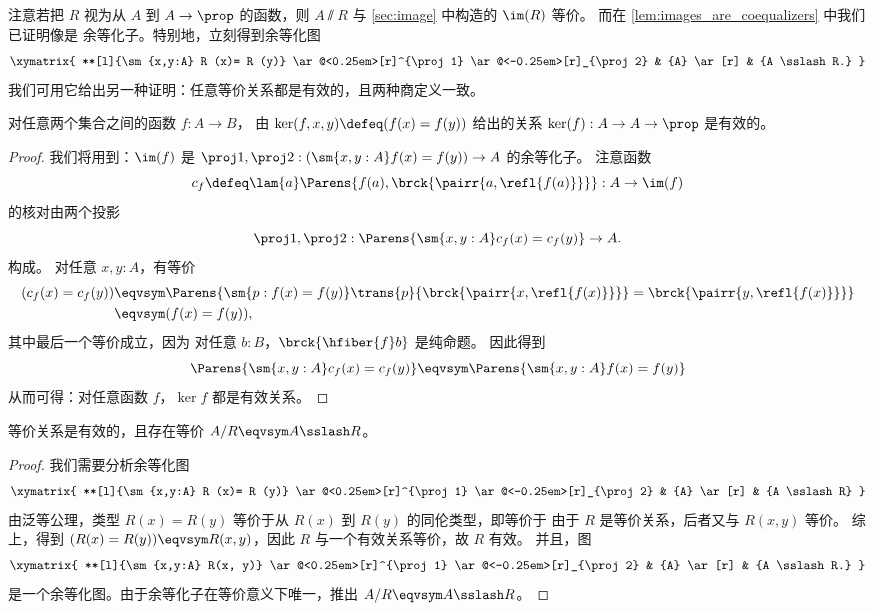 注意若把 $R$ 视为从 $A$ 到 $A\to \prop$ 的函数，则 $A\sslash R$ 与 \cref{sec:image} 中构造的 $\im(R)$ 等价。
而在 \cref{lem:images_are_coequalizers} 中我们已证明像是
余等化子。特别地，立刻得到余等化图
\begin{equation*}
  \xymatrix{
    **[l]{\sm{x,y:A} R (x)= R (y)}
    \ar@<0.25em>[r]^{\proj1}
    \ar@<-0.25em>[r]_{\proj2}
    &
    {A}
    \ar[r]
    &
    {A \sslash R.}
  }
\end{equation*}
我们可用它给出另一种证明：任意等价关系都是有效的，且两种商定义一致。

\begin{thm}\label{prop:kernels_are_effective}
对任意两个集合之间的函数 $f:A\to B$，
由
$\ker(f,x,y)\defeq (f(x)= f(y))$
给出的关系 $\ker(f):A\to A\to\prop$ 是有效的。
\end{thm}

\begin{proof}
我们将用到：$\im(f)$ 是
$\proj1,\proj2:(\sm{x,y:A} f(x)= f(y))\to A$ 的余等化子。
注意函数
\[c_f\defeq\lam{a} \Parens{f(a),\brck{\pairr{a,\refl{f(a)}}}}
: A \to \im(f)
\]
的核对由两个投影
\begin{equation*}
\proj1,\proj2:\Parens{\sm{x,y:A} c_f(x)= c_f(y)}\to A.
\end{equation*}
构成。
对任意 $x,y:A$，有等价
\begin{align*}
  (c_f(x)= c_f(y))
  & \eqvsym \Parens{\sm{p:f(x)= f(y)} \trans{p}{\brck{\pairr{x,\refl{f(x)}}}} =\brck{\pairr{y,\refl{f(x)}}}}\\
  & \eqvsym (f(x)= f(y)),
\end{align*}
其中最后一个等价成立，因为
对任意 $b:B$，$\brck{\hfiber{f}b}$ 是纯命题。
因此得到
\begin{equation*}
\Parens{\sm{x,y:A} c_f(x)= c_f(y)}\eqvsym \Parens{\sm{x,y:A} f(x)= f(y)}
\end{equation*}
从而可得：对任意函数 $f$，$\ker f$ 都是有效关系。
\end{proof}

\begin{thm}
等价关系是有效的，且存在等价 $A/R \eqvsym A\sslash  R $。
\end{thm}

\begin{proof}
我们需要分析余等化图
\begin{equation*}
  \xymatrix{
    **[l]{\sm{x,y:A} R (x)= R (y)}
    \ar@<0.25em>[r]^{\proj1}
    \ar@<-0.25em>[r]_{\proj2}
    &
    {A}
    \ar[r]
    &
    {A \sslash R}
  }
\end{equation*}
由泛等公理，类型 $R(x) = R(y)$ 等价于从 $R(x)$ 到 $R(y)$ 的同伦类型，即等价于
由于 $R$ 是等价关系，后者又与 $R(x,y)$ 等价。
综上，得到 $(R(x) = R(y)) \eqvsym R(x,y)$，因此 $R$ 与一个有效关系等价，故 $R$ 有效。
并且，图
\begin{equation*}
  \xymatrix{
    **[l]{\sm{x,y:A} R(x, y)}
    \ar@<0.25em>[r]^{\proj1}
    \ar@<-0.25em>[r]_{\proj2}
    &
    {A}
    \ar[r]
    &
    {A \sslash R.}
  }
\end{equation*}
是一个余等化图。由于余等化子在等价意义下唯一，推出 $A/R \eqvsym A\sslash  R $。
\end{proof}

